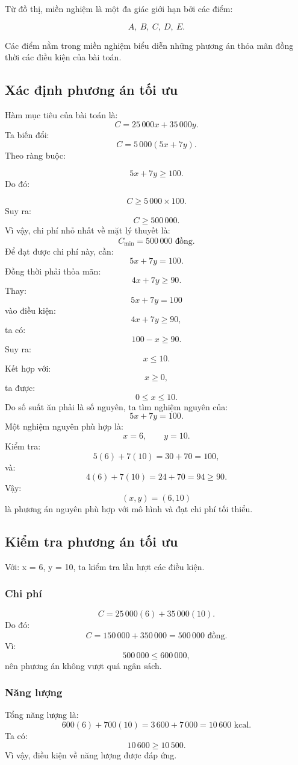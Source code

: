 \documentclass[12pt,a4paper]{article}
\begin{document}
Từ đồ thị, miền nghiệm là một đa giác giới hạn bởi các điểm:

\[
A,\ B,\ C,\ D,\ E.
\]

Các điểm nằm trong miền nghiệm biểu diễn những phương án thỏa mãn đồng thời các điều kiện của bài toán.


\subsection{Xác định phương án tối ưu}

Hàm mục tiêu của bài toán là:
\[
C=25\,000x+35\,000y.
\]
Ta biến đổi:
\[
C=5\,000(5x+7y).
\]
Theo ràng buộc:

\[
5x+7y\geq100.
\]
Do đó:

\[
C\geq5\,000\times100.
\]
Suy ra:
\[
C\geq500\,000.
\]
Vì vậy, chi phí nhỏ nhất về mặt lý thuyết là:
\[
\boxed{
C_{\min}=500\,000\text{ đồng}.
}
\]
Để đạt được chi phí này, cần:
\[
5x+7y=100.
\]
Đồng thời phải thỏa mãn:
\[
4x+7y\geq90.
\]
Thay:
\[
5x+7y=100
\]
vào điều kiện:
\[
4x+7y\geq90,
\]
ta có:
\[
100-x\geq90.
\]
Suy ra:
\[
x\leq10.
\]
Kết hợp với:
\[
x\geq0,
\]
ta được:
\[
0\leq x\leq10.
\]
Do số suất ăn phải là số nguyên, ta tìm nghiệm nguyên của:
\[
5x+7y=100.
\]
Một nghiệm nguyên phù hợp là:
\[
x=6,\qquad y=10.
\]
Kiểm tra:
\[
5(6)+7(10)=30+70=100,
\]
và:
\[
4(6)+7(10)=24+70=94\geq90.
\]
Vậy:
\[
\boxed{
(x,y)=(6,10)
}
\]
là phương án nguyên phù hợp với mô hình và đạt chi phí tối thiểu.


\subsection{Kiểm tra phương án tối ưu}

Với: x = 6, y = 10, ta kiểm tra lần lượt các điều kiện.
\subsubsection*{Chi phí}
\[
C=25\,000(6)+35\,000(10).
\]
Do đó:
\[
C=150\,000+350\,000
=500\,000\text{ đồng}.
\]
Vì:
\[
500\,000\leq600\,000,
\]
nên phương án không vượt quá ngân sách.
\subsubsection*{Năng lượng}
Tổng năng lượng là:
\[
600(6)+700(10)
=3\,600+7\,000
=10\,600\text{ kcal}.
\]
Ta có:
\[
10\,600\geq10\,500.
\]
Vì vậy, điều kiện về năng lượng được đáp ứng.
\end{document}
